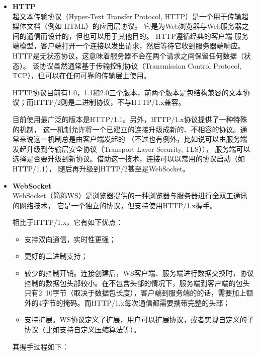 \begin{itemize}

    \item \textbf{HTTP} \\

    超文本传输协议\cite{rfc7230}（Hyper-Text Transfer Protocol, HTTP）是一个用于传输超媒体文档（例如 HTML）的应用层协议。
    它是为Web浏览器与Web服务器之间的通信而设计的，但也可以用于其他目的。
    HTTP遵循经典的客户端-服务端模型，客户端打开一个连接以发出请求，然后等待它收到服务器端响应。
    HTTP是无状态协议，这意味着服务器不会在两个请求之间保留任何数据（状态）。
    该协议虽然通常基于传输控制协议\cite{rfc793}（Transmission Control Protocol, TCP），但可以在任何可靠的传输层上使用。

    HTTP协议目前有1.0，1.1和2.0三个版本，前两个版本是包结构兼容的文本协议；而HTTP/2则是二进制协议\cite{rfc7540}，不与HTTP/1.x兼容。

    目前使用最广泛的版本是HTTP/1.1。另外，HTTP/1.x协议提供了一种特殊的机制，
    这一机制允许将一个已建立的连接升级成新的、不相容的协议。通常来说这一机制总是由客户端发起的
    （不过也有例外，比如说可以由服务端发起升级到传输层安全协议\cite{rfc8446}（Transport Layer Security, TLS）），
    服务端可以选择是否要升级到新协议。借助这一技术，连接可以以常用的协议启动（如HTTP/1.1），
    随后再升级到HTTP/2甚至是WebSocket\cite{rfc6455}。

    \item \textbf{WebSocket} \\

    WebSocket（简称WS）是浏览器提供的一种浏览器与服务器进行全双工通讯的网络技术，
    它是一个独立的协议，但支持使用HTTP/1.x握手。

    相比于HTTP/1.x，它有如下优点：

    \begin{itemize}
        \item 支持双向通信，实时性更强；
        \item 更好的二进制支持；
        \item 较少的控制开销。连接创建后，WS客户端、服务端进行数据交换时，协议控制的数据包头部较小。在不包含头部的情况下，服务端到客户端的包头只有2~10字节（取决于数据包长度），客户端到服务端的的话，需要加上额外的4字节的掩码。而HTTP/1.x每次通信都需要携带完整的头部；
        \item 支持扩展。WS协议定义了扩展，用户可以扩展协议，或者实现自定义的子协议（比如支持自定义压缩算法等）。
    \end{itemize}

    其握手过程如下：


\end{itemize}
